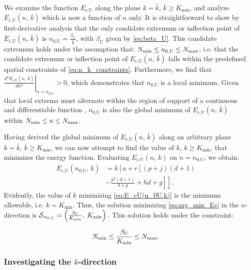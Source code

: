 \documentclass[twocolumn,english]{IEEEtran}
\theoremstyle{plain}
\theoremstyle{definition}
\begin{document}
We examine the function $E_{\text{c,U}}$ along the plane $k=\bar{k}$,
$\bar{k}\ge K_{\text{min}}$, and analyze $E_{\text{c,U}}(n,\,\bar{k})$
which is now a function of $n$ only. It is straightforward to show
by first-derivative analysis that the only candidate extremum or inflection
point of $E_{\text{c,U}}(n,\,\bar{k})$ is $n_{\text{0,U}}=\frac{\beta_{\text{U}}}{\bar{k}}$,
with $\beta_{\text{U}}$ given by \ref{eq:beta_U}. This candidate
extremum holds under the assumption that: $N_{\textnormal{min}}\le n_{\text{0,U}}\le N_{\textnormal{max}}$,
i.e. that the candidate extremum or inflection point of $E_{\text{c,U}}(n,\,\bar{k})$
falls within the predefined spatial constraints of \eqref{eq:n_k_constraints}.
Furthermore, we find that $\left.\frac{d^{2}E_{\text{c,U}}(n,\,\bar{k})}{dn^{2}}\right|_{n=n_{\text{0,U}}}>0$,
which demonstrates that $n_{\text{0,U}}$ is a local minimum. Given
that local extrema must alternate within the region of support of
a continuous and differentiable function \cite{hardy2008course},
$n_{\text{0,U}}$ is also the global minimum of $E_{\text{c,U}}(n,\,\bar{k})$
within $N_{\textnormal{min}}\le n\le N_{\textnormal{max}}$.

Having derived the global minimum of $E_{\text{c,U}}(n,\,\bar{k})$
along an arbitrary plane $k=\bar{k}$, $\bar{k}\ge K_{\text{min}}$,
we can now attempt to find the value of $k$, $k\ge K_{\text{min}}$,
that minimizes the energy function. Evaluating $E_{\text{c,U}}(n,\, k)$
on $n=n_{\text{0,U}}$, we obtain: 
\begin{align}
E_{\text{c,U}}(n_{\text{0,U}},\, k) & =k\left[a+r\left[\left(p+j\right)\left(d+1\right)\right.\right.\nonumber \\
 & \left.\left.-\frac{p^{2}(d+1)}{b+p}+hd+g\right]\right].\label{eq:E_cU(n_0U,k)}
\end{align}
Evidently, the value of $k$ minimizing \eqref{eq:E_cU(n_0U,k)} is
the minimum allowable, i.e. $k=K_{\textrm{min}}$. Thus, the solution
minimizing \eqref{eq:arg_min_Ec} in the $n$-direction is $\text{\ensuremath{\mathcal{S}}}_{n_{0,\text{U}}}=\left(\frac{\beta_{\text{U}}}{K_{\text{min}}},\; K_{\text{min}}\right).$
This solution holds under the constraint:

\begin{equation}
N_{\textnormal{min}}\le\frac{\beta_{\text{U}}}{K_{\text{min}}}\le N_{\textnormal{max}}.\label{eq:constraint_S_n_oU}
\end{equation}



\subsubsection{Investigating the $k$-direction}
\end{document}

